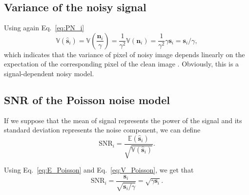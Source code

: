 \subsection{Variance of the noisy signal}
Using again Eq.~\ref{eq:PN_i}
\begin{equation}
  \mathbb{V}(\hat{\mathbf{s}}_i) = \mathbb{V}\left(\frac{\mathbf{n}_i}{\gamma}\right) = \frac{1}{\gamma^2}\mathbb{V}(\mathbf{n}_i) = \frac{1}{\gamma^2}\gamma\mathbf{s}_i = \mathbf{s}_i/\gamma,
  \label{eq:V_Poisson}
\end{equation}
which indicates that the variance of pixel of noisy image depends
linearly on the expectation of the corresponding pixel of the clean
image \cite{foi2008practical}. Obviously, this is a signal-dependent
noisy model.

\begin{comment}
In the exteme case where $\mathbf{s}=\mathbf{0}$, we get that
\begin{equation}
  \mathbb{E}(\hat{\mathbf{s}}) = 0,
\end{equation}
and
\begin{equation}
  \mathbb{V}(\hat{\mathbf{s}}) = 0.
\end{equation}
If $\mathbf{s}=\mathbf{1}$, then
\begin{equation}
  \mathbb{E}(\hat{\mathbf{s}}) = 1,
\end{equation}
and
\begin{equation}
  \mathbb{V}(\hat{\mathbf{s}}) = 1/\gamma.
\end{equation}
\end{comment}

\subsection{SNR of the Poisson noise model}

If we suppose that the mean of signal represents the power of the signal and its standard
deviation represents the noise component, we can define
\begin{equation}
  \text{SNR}_i = \frac{\mathbb{E}(\hat{\mathbf{s}}_i)}{\sqrt{\mathbb{V}(\hat{\mathbf{s}}_i)}}.
  \label{eq:SNR_mean_deviation}
\end{equation}

Using Eq.~\ref{eq:E_Poisson} and Eq.~\ref{eq:V_Poisson}, we get that
\begin{equation}
  \text{SNR}_i = \frac{\mathbf{s}_i}{\sqrt{\mathbf{s}_i/\gamma}} = \sqrt{\gamma\mathbf{s}_i}.
  \label{eq:SNR_Poisson}
\end{equation}

